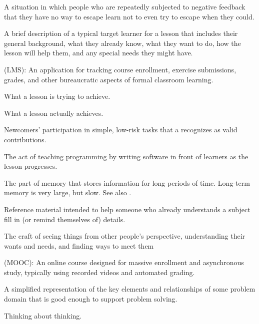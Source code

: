 \begin{description}
 A situation in which
people who are repeatedly subjected to negative feedback that they have no way
to escape learn not to even try to escape when they could.

 A brief description of a typical
target learner for a lesson that includes their general background, what they
already know, what they want to do, how the lesson will help them, and any
special needs they might have.

(LMS): An application for tracking course
enrollment, exercise submissions, grades, and other bureaucratic aspects of
formal classroom learning.

 What a lesson is trying to
achieve.

 What a lesson actually achieves.

 Newcomers' participation in simple, low-risk tasks that a
 recognizes as valid contributions.

 The act of teaching programming by writing
software in front of learners as the lesson progresses.

 The part of memory that stores
information for long periods of time. Long-term memory is very large, but
slow. See also .

 Reference material intended to help someone who
already understands a subject fill in (or remind themselves of) details.

 The craft of seeing things from other people's
perspective, understanding their wants and needs, and finding ways to meet them

(MOOC): An online course designed
for massive enrollment and asynchronous study, typically using recorded videos
and automated grading.

 A simplified representation of the key
elements and relationships of some problem domain that is good enough to support
problem solving.

 Thinking about thinking.


\end{description}
